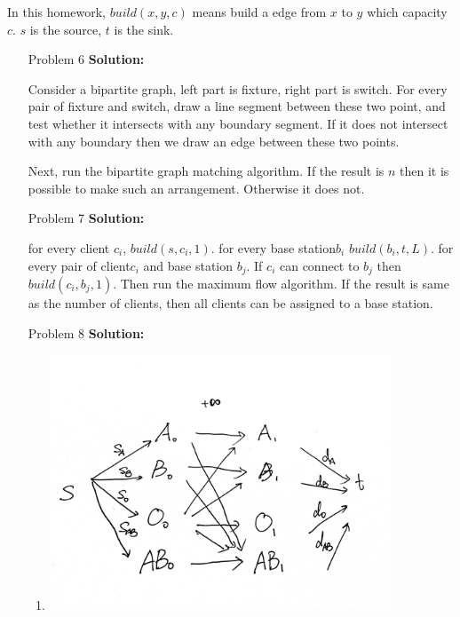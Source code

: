 \normalfont\documentclass[letterpaper,11pt]{article}
\begin{document}
\setlength{\parindent}{2ex}
\newcommand{\header}{
	\noindent {}
}
\bigskip
\header
In this homework, $build(x,y,c)$ means build a edge from $x$ to $y$ which capacity $c$.
$s$ is the source, $t$ is the sink.
\begin{enumerate}
\item [Problem 6]\textbf{Solution:}\par
	Consider a bipartite graph, left part is fixture, right part is switch. For every pair of fixture and switch, draw a line segment between these two point, and test whether it intersects with any boundary segment. If it does not intersect with any boundary then we draw an edge between these two points.\par
	Next, run the bipartite graph matching algorithm. If the result is $n$ then it is possible to make such an arrangement. Otherwise it does not.
\item [Problem 7]\textbf{Solution:}\par
	for every client $c_i$, $build(s,c_i,1)$. for every base station$b_i$ $build(b_i,t,L)$. for every pair of client$c_i$ and base station $b_j$. If $c_i$ can connect to $b_j$ then $build(c_i,b_j,1)$. Then run the maximum flow algorithm. If the result is same as the number of clients, then all clients can be assigned to a base station.
\item [Problem 8]\textbf{Solution:}\par
	\begin{enumerate}
	\item
	\includegraphics[width = 4in]{1.JPG}\par

\end{enumerate}
\end{enumerate}
\end{document}
